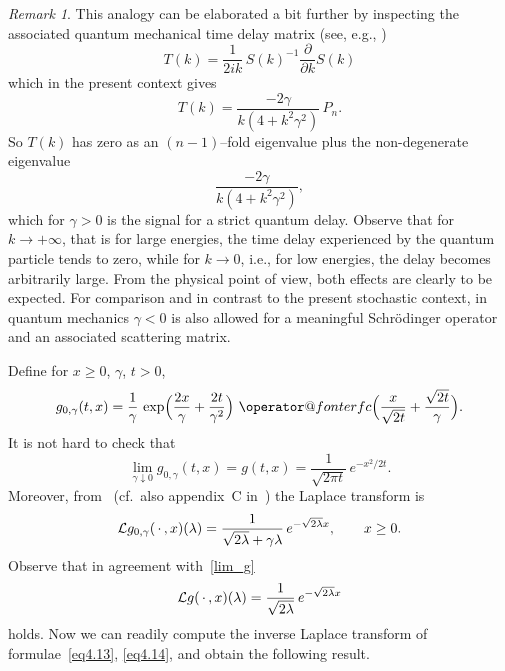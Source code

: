 \documentclass[11pt,a4paper]{amsart}
\makeatletter
\renewcommand{\gg}{\gamma}
\newcommand{\gl}{\lambda}
\newcommand{\cL}{\mathcal{L}}
\newcommand{\1}{1}
\newcommand{\p}{\partial}
\theoremstyle{remark}
\newtheorem{remark}[theorem]{Remark}
\newcommand{\erfc}{\mathop{\operator@font erfc}\nolimits}
\newcommand{\sgl}{\ensuremath\sqrt{2\gl}}
\numberwithin{equation}{section}
\makeatother
\begin{document}
\begin{remark}
This analogy can be elaborated a bit further by inspecting the associated quantum mechanical
time delay matrix (see, e.g., \cite{AmJa77, BrFr02, JaMi72, Ma76, Ma81, Na80, Wi55})
\begin{equation*}
	T(k) = \frac{1}{2ik}\,S(k)^{-1}\frac{\p}{\p k} S(k)
\end{equation*}
which in the present context gives
\begin{equation*}
	T(k) = \frac{-2\gg}{k(4+k^2\gg^2)}\,P_n.
\end{equation*}
So $T(k)$ has zero as an $(n-1)$--fold eigenvalue plus the non-degenerate
eigenvalue
\begin{equation*}
	\frac{-2\gg}{k(4+k^2\gg^2)},
\end{equation*}
which for $\gg>0$ is the signal for a strict quantum delay. Observe that for
$k\to +\infty$, that is for large energies, the time delay experienced by the
quantum particle tends to zero, while for $k\to 0$, i.e., for low energies,
the delay becomes arbitrarily large. From the physical point of view, both
effects are clearly to be expected. For comparison and in contrast to the
present stochastic context, in quantum mechanics $\gg<0$ is also allowed for a
meaningful Schr\"odinger operator and an associated scattering matrix.
\end{remark}

Define for $x\ge 0$, $\gg$, $t>0$,
\begin{equation}    \label{eq4.15}
    g_{0,\gg}(t,x) = \frac{1}{\gg}\,\exp\Bigl(\frac{2x}{\gg} + \frac{2t}{\gg^2}\Bigr)\,
                    \erfc\Bigl(\frac{x}{\sqrt{2t}}+\frac{\sqrt{2t}}{\gg}\Bigr).
\end{equation}
It is not hard to check that
\begin{equation}	\label{lim_g}
    \lim_{\gg\downarrow 0} g_{0,\gg}(t,x) = g(t,x) = \frac{1}{\sqrt{2\pi t}}\,e^{-x^2/2t}.
\end{equation}
Moreover, from~\cite[eq.~(5.6.16)]{ErMa54a} (cf.\ also appendix~C
in~\cite{BMMG0}) the Laplace transform is
\begin{equation}    \label{eq4.16}
    \cL g_{0,\gg}(\,\cdot\,,x)(\gl) = \frac{1}{\sgl + \gg\gl}\,e^{-\sgl x},\qquad x\ge 0.
\end{equation}
Observe that in agreement with~\eqref{lim_g}
\begin{equation*}
	\cL g(\,\cdot\,,x)(\gl) = \frac{1}{\sgl}\,e^{-\sgl x}
\end{equation*}
holds. Now we can readily compute the inverse Laplace transform of formulae~\eqref{eq4.13},
\eqref{eq4.14}, and obtain the following result.
\end{document}
